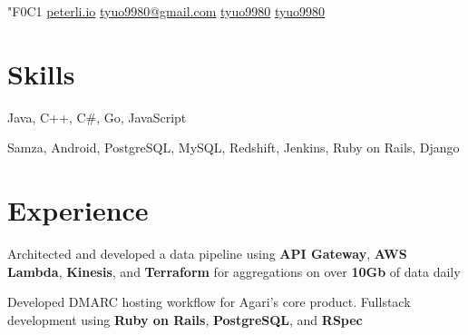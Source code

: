 \documentclass[]{peter_resume}
\begin{document}

{

   {\fa\char"F0C1} \href{http://peterli.io}{peterli.io}
     \href{mailto:tyuo9980@gmail.com}{tyuo9980@gmail.com}
     \href{https://github.com/tyuo9980}{tyuo9980}
     \href{https://www.linkedin.com/in/tyuo9980}{tyuo9980} 
}
\sectionsep
\vspace{0.3cm}

\begin{minipage}{\textwidth}


\section{Skills}
{\hspace{2.1cm} Java, C++, C\#, Go, JavaScript}
\vspace{0.1cm}

{\hfill Samza, Android, PostgreSQL, MySQL, Redshift, Jenkins, Ruby on Rails, Django}
\sectionsep


\section{Experience}
\vspace{\topsep} %
\begin{tightemize}
\item Architected and developed a data pipeline using \textbf{API Gateway}, \textbf{AWS Lambda}, \textbf{Kinesis}, and \textbf{Terraform} for aggregations on over \textbf{10Gb} of data daily
\item Developed DMARC hosting workflow for Agari's core product. Fullstack development using \textbf{Ruby on Rails}, \textbf{PostgreSQL}, and \textbf{RSpec}
\end{tightemize}
\sectionsep


\end{minipage}
\end{document}

